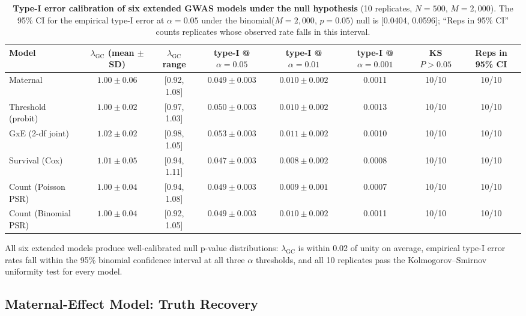 \documentclass[11pt,a4paper]{article}
\begin{document}
\begin{table}[H]
  \centering
  \caption{\textbf{Type-I error calibration of six extended GWAS models under the null hypothesis} (10 replicates, $N=500$, $M=2{,}000$). The 95\% CI for the empirical type-I error at $\alpha = 0.05$ under the binomial($M=2{,}000$, $p=0.05$) null is [0.0404, 0.0596]; ``Reps in 95\% CI'' counts replicates whose observed rate falls in this interval.}
  \label{tab:type1_extended}
  \begin{tabular}{lccccccc}
  \toprule
  Model & $\lambda_{\text{GC}}$ (mean $\pm$ SD) & $\lambda_{\text{GC}}$ range & type-I @ $\alpha=0.05$ & type-I @ $\alpha=0.01$ & type-I @ $\alpha=0.001$ & KS $P > 0.05$ & Reps in 95\% CI \\
  \midrule
  Maternal & $1.00 \pm 0.06$ & [0.92, 1.08] & $0.049 \pm 0.003$ & $0.010 \pm 0.002$ & 0.0011 & 10/10 & 10/10 \\
  Threshold (probit) & $1.00 \pm 0.02$ & [0.97, 1.03] & $0.050 \pm 0.003$ & $0.010 \pm 0.002$ & 0.0013 & 10/10 & 10/10 \\
  GxE (2-df joint) & $1.02 \pm 0.02$ & [0.98, 1.05] & $0.053 \pm 0.003$ & $0.011 \pm 0.002$ & 0.0010 & 10/10 & 10/10 \\
  Survival (Cox) & $1.01 \pm 0.05$ & [0.94, 1.11] & $0.047 \pm 0.003$ & $0.008 \pm 0.002$ & 0.0008 & 10/10 & 10/10 \\
  Count (Poisson PSR) & $1.00 \pm 0.04$ & [0.94, 1.08] & $0.049 \pm 0.003$ & $0.009 \pm 0.001$ & 0.0007 & 10/10 & 10/10 \\
  Count (Binomial PSR) & $1.00 \pm 0.04$ & [0.92, 1.05] & $0.049 \pm 0.003$ & $0.010 \pm 0.002$ & 0.0011 & 10/10 & 10/10 \\
  \bottomrule
  \end{tabular}
\end{table}

All six extended models produce well-calibrated null p-value distributions: $\lambda_{\text{GC}}$ is within 0.02 of unity on average, empirical type-I error rates fall within the 95\% binomial confidence interval at all three $\alpha$ thresholds, and all 10 replicates pass the Kolmogorov--Smirnov uniformity test for every model.

\subsection{Maternal-Effect Model: Truth Recovery}
\label{sec:maternal_truth}
\end{document}
